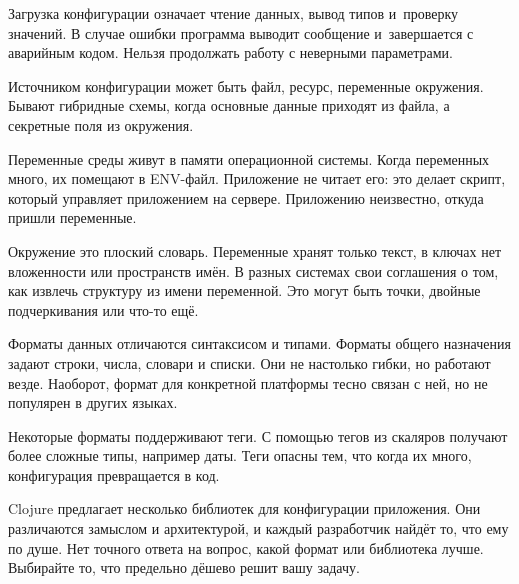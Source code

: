 Загрузка конфигурации означает чтение данных, вывод типов и~проверку значений. В
случае ошибки программа выводит сообщение и~завершается с аварийным
кодом. Нельзя продолжать работу с неверными параметрами.

Источником конфигурации может быть файл, ресурс, переменные окружения. Бывают
гибридные схемы, когда основные данные приходят из файла, а секретные поля из
окружения.

Переменные среды живут в памяти операционной системы. Когда переменных много, их
помещают в ENV-файл. Приложение не читает его: это делает скрипт, который
управляет приложением на сервере. Приложению неизвестно, откуда пришли
переменные.

Окружение это плоский словарь. Переменные хранят только текст, в ключах нет
вложенности или пространств имён. В разных системах свои соглашения о том, как
извлечь структуру из имени переменной. Это могут быть точки, двойные
подчеркивания или что-то ещё.

Форматы данных отличаются синтаксисом и типами. Форматы общего назначения задают
строки, числа, словари и списки. Они не настолько гибки, но работают
везде. Наоборот, формат для конкретной платформы тесно связан с ней, но не
популярен в других языках.

Некоторые форматы поддерживают теги. С помощью тегов из скаляров получают более
сложные типы, например даты. Теги опасны тем, что когда их много, конфигурация
превращается в код.

Clojure предлагает несколько библиотек для конфигурации приложения. Они
различаются замыслом и архитектурой, и каждый разработчик найдёт то, что ему по
душе. Нет точного ответа на вопрос, какой формат или библиотека лучше. Выбирайте
то, что предельно дёшево решит вашу задачу.
